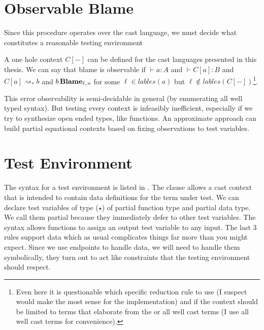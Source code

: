 \section{Observable Blame}
Since this procedure operates over the cast language, we must decide what constitutes a reasonable testing environment
 
A one hole context $C[-]$ can be defined for the cast languages presented in this thesis.
We can say that blame is observable if $\vdash a:A$ and $\vdash C[a]:B$ and $C[a]\rightsquigarrow_{*}b$ and $b\,\textbf{Blame}{}_{\ell, \,o}$ for some $\ell \in lables\left(a\right)$ but $\ell \notin lables\left(C[-]\right)$\footnote{
 Even here it is questionable which specific reduction rule to use (I suspect \cbv{} would make the most sense for the implementation) and if the context should be limited to terms that elaborate from the \slang or all well cast terms (I use all well cast terms for convenience).
}.
 
This error observability is semi-decidable in general (by enumerating all well typed syntax).
But testing every context is infeasibly inefficient, especially if we try to synthesize open ended types, like functions.
An approximate approach can build partial equational contexts based on fixing observations to test variables.
 
 
\section{Test Environment}
The syntax for a test environment is listed in .
The clause allows a cast context that is intended to contain data definitions for the term under test.
We can declare test variables of type ($\star$) of partial function type and partial data type.
We call them partial because they immediately defer to other test variables.
The syntax allows functions to assign an output test variable to any input.
The last 3 rules support data which as usual complicates things far more than you might expect.
Since we use endpoints to handle data, we will need to handle them symbolically, they turn out to act like constraints that the testing environment should respect.


